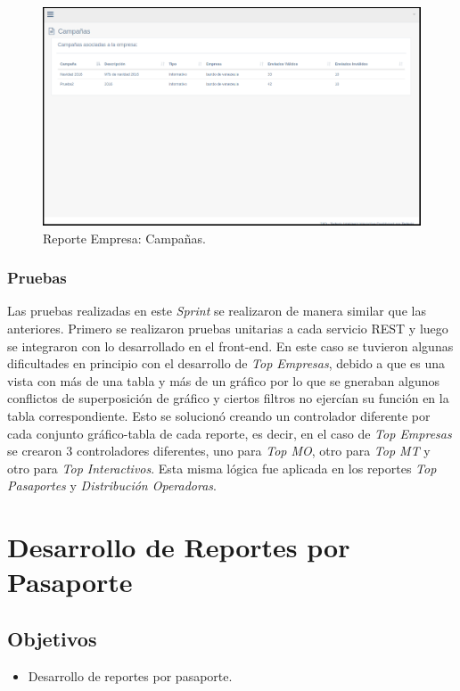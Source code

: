 \begin{figure}[ht]
  \centering
  \includegraphics[scale=0.30,type=png,ext=.png,read=.png]{imagenes/campana}
  \caption{Reporte Empresa: Campañas.}
  \label{fig:campana}
\end{figure}

\subsubsection{Pruebas}
\indent Las pruebas realizadas en este \textit{Sprint} se realizaron de manera similar que las anteriores. Primero se realizaron pruebas unitarias a cada servicio REST y luego se integraron con lo desarrollado en el front-end. En este caso se tuvieron algunas dificultades en principio con el desarrollo de \textit{Top Empresas}, debido a que es una vista con más de una tabla y más de un gráfico por lo que se gneraban algunos conflictos de superposición de gráfico y ciertos filtros no ejercían su función en la tabla correspondiente. Esto se solucionó creando un controlador diferente por cada conjunto gráfico-tabla de cada reporte, es decir, en el caso de \textit{Top Empresas} se crearon 3 controladores diferentes, uno para \textit{Top MO}, otro para \textit{Top MT} y otro para \textit{Top Interactivos}. Esta misma lógica fue aplicada en los reportes \textit{Top Pasaportes} y \textit{Distribución Operadoras}.  


\section{Desarrollo de Reportes por Pasaporte} \label{sect:Desarrollo de Reportes por Pasaporte}

\subsection{Objetivos}
\begin{itemize}[noitemsep,nolistsep]
\item Desarrollo de reportes por pasaporte. 
\end{itemize}

